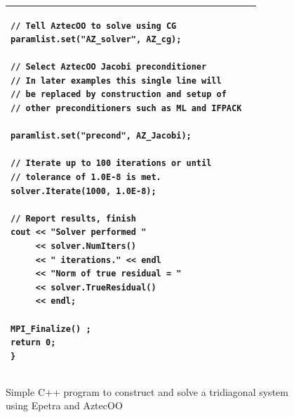 \documentclass[12pt,relax]{TPA}
\begin{document}
\begin{figure}
{\begin{tabular}{|p{2.4in}|p{2.4in}|}
\begin{verbatim}
// Tell AztecOO to solve using CG
paramlist.set("AZ_solver", AZ_cg);
 
// Select AztecOO Jacobi preconditioner
// In later examples this single line will
// be replaced by construction and setup of
// other preconditioners such as ML and IFPACK

paramlist.set("precond", AZ_Jacobi);

// Iterate up to 100 iterations or until
// tolerance of 1.0E-8 is met.
solver.Iterate(1000, 1.0E-8);

// Report results, finish     
cout << "Solver performed " 
     << solver.NumIters()  
     << " iterations." << endl
     << "Norm of true residual = " 
     << solver.TrueResidual() 
     << endl;

MPI_Finalize() ;
return 0;
}
\end{verbatim}
\\\hline
\end{tabular}}
\caption{\label{fig:solvetrid} Simple C++ program to construct and
solve a tridiagonal system using Epetra and AztecOO}
\end{figure}
\end{document}
